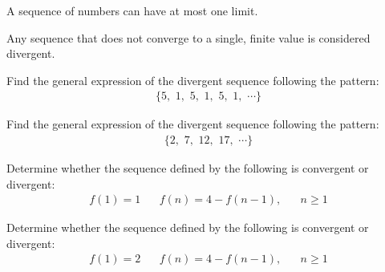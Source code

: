 \begin{theorem}
A sequence of numbers can have at most one limit.
\label{limit_uniqueness}
\end{theorem}

\begin{note}
Any sequence that does not converge to a single, finite value is considered divergent.
\end{note}

\begin{exercise}
Find the general expression of the divergent sequence following the pattern:
\begin{align*}
    \{5, \hspace{4pt} 1, \hspace{4pt} 5, \hspace{4pt} 1, \hspace{4pt} 5, \hspace{4pt} 1, \hspace{4pt} \cdots\}
\end{align*}
\end{exercise}

\begin{exercise}
Find the general expression of the divergent sequence following the pattern:
\begin{align*}
    \{2, \hspace{4pt} 7, \hspace{4pt} 12, \hspace{4pt} 17, \hspace{4pt} \cdots\}
\end{align*}
\end{exercise}

\begin{exercise}
Determine whether the sequence defined by the following is convergent or divergent:
\begin{align*}
    f(1) = 1 \hspace{20pt} f(n) = 4 - f(n-1), \hspace{20pt} n \geq 1
\end{align*}
\end{exercise}

\begin{exercise}
Determine whether the sequence defined by the following is convergent or divergent:
\begin{align*}
    f(1) = 2 \hspace{20pt} f(n) = 4 - f(n-1), \hspace{20pt} n \geq 1
\end{align*}
\end{exercise}

